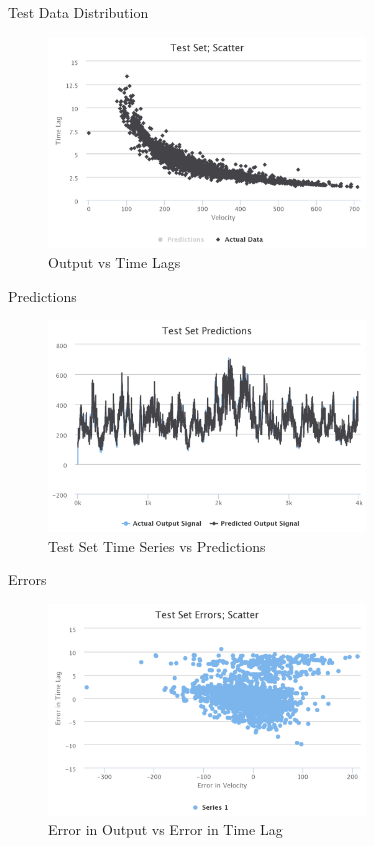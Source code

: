 \documentclass{beamer}
\begin{document}
\begin{frame}{Test Data Distribution}
    \begin{figure}[h]
        \includegraphics[width=0.75\textwidth]{data-scatter-ii.png}
        \caption{Output vs Time Lags}
        \label{fig:VelTimeLags-ii}
      \end{figure}
\end{frame}


\begin{frame}{Predictions}
    \begin{figure}[h]
        \includegraphics[width=0.75\textwidth]{predictions-ii.png}
        \caption{Test Set Time Series vs Predictions}
        \label{fig:predictions-ii}
      \end{figure}
\end{frame}

\begin{frame}{Errors}
    \begin{figure}[h]
        \includegraphics[width=0.75\textwidth]{errors-ii.png}
        \caption{Error in Output vs Error in Time Lag}
        \label{fig:errors-ii}
      \end{figure}
\end{frame}
\end{document}
